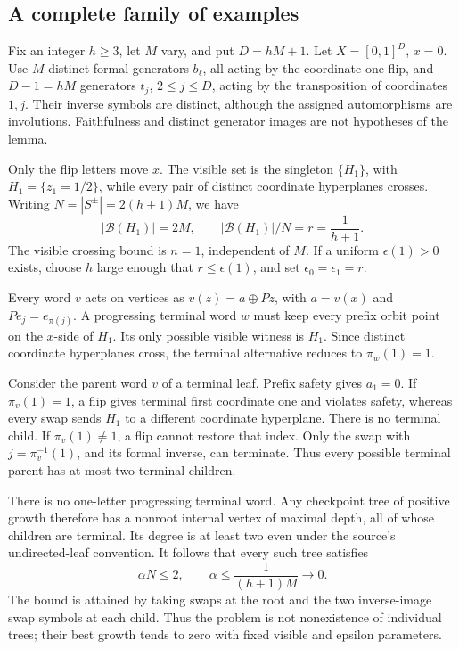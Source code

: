 \documentclass[10pt]{article}
\begin{document}
\subsection*{A complete family of examples}
Fix an integer \(h\ge3\), let \(M\) vary, and put \(D=hM+1\). Let \(X=[0,1]^D\), \(x=0\). Use \(M\) distinct formal generators \(b_\ell\), all acting by the coordinate-one flip, and \(D-1=hM\) generators \(t_j\), \(2\le j\le D\), acting by the transposition of coordinates \(1,j\). Their inverse symbols are distinct, although the assigned automorphisms are involutions. Faithfulness and distinct generator images are not hypotheses of the lemma.\par
Only the flip letters move \(x\). The visible set is the singleton \(\{H_1\}\), with \(H_1=\{z_1=1/2\}\), while every pair of distinct coordinate hyperplanes crosses. Writing \(N=|S^\pm|=2(h+1)M\), we have \[|\mathcal B(H_1)|=2M,\qquad
 |\mathcal B(H_1)|/N=r=\frac1{h+1}.\] The visible crossing bound is \(n=1\), independent of \(M\). If a uniform \(\epsilon(1)>0\) exists, choose \(h\) large enough that \(r\le\epsilon(1)\), and set \(\epsilon_0=\epsilon_1=r\).\par
Every word \(v\) acts on vertices as \(v(z)=a\mathbin{\oplus}Pz\), with \(a=v(x)\) and \(Pe_j=e_{\pi(j)}\). A progressing terminal word \(w\) must keep every prefix orbit point on the \(x\)-side of \(H_1\). Its only possible visible witness is \(H_1\). Since distinct coordinate hyperplanes cross, the terminal alternative reduces to \(\pi_w(1)=1\).\par
Consider the parent word \(v\) of a terminal leaf. Prefix safety gives \(a_1=0\). If \(\pi_v(1)=1\), a flip gives terminal first coordinate one and violates safety, whereas every swap sends \(H_1\) to a different coordinate hyperplane. There is no terminal child. If \(\pi_v(1)\ne1\), a flip cannot restore that index. Only the swap with \(j=\pi_v^{-1}(1)\), and its formal inverse, can terminate. Thus every possible terminal parent has at most two terminal children.\par
There is no one-letter progressing terminal word. Any checkpoint tree of positive growth therefore has a nonroot internal vertex of maximal depth, all of whose children are terminal. Its degree is at least two even under the source’s undirected-leaf convention. It follows that every such tree satisfies \[\alpha N\le2,\qquad
 \alpha\le\frac1{(h+1)M}\longrightarrow0.\] The bound is attained by taking swaps at the root and the two inverse-image swap symbols at each child. Thus the problem is not nonexistence of individual trees; their best growth tends to zero with fixed visible and epsilon parameters.\par
\end{document}
